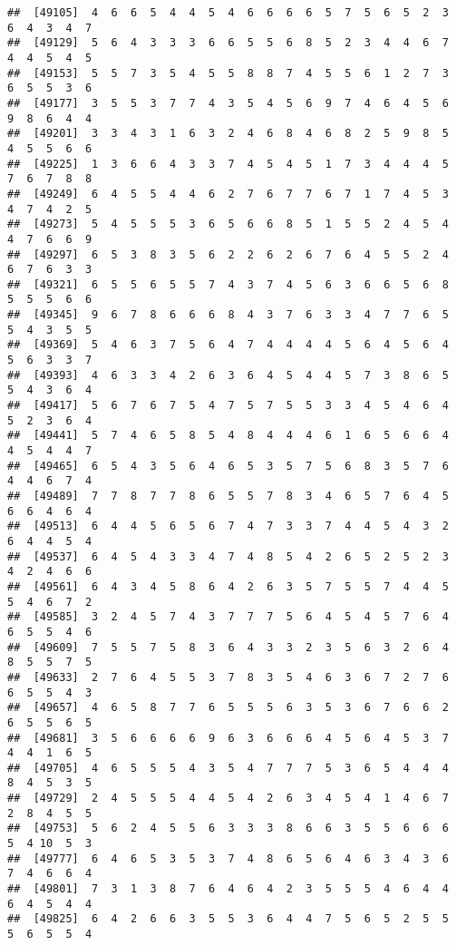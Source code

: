 \documentclass[
]{book}
\begin{document}
\begin{verbatim}
##  [49105]  4  6  6  5  4  4  5  4  6  6  6  6  5  7  5  6  5  2  3  6  4  3  4  7
##  [49129]  5  6  4  3  3  3  6  6  5  5  6  8  5  2  3  4  4  6  7  4  4  5  4  5
##  [49153]  5  5  7  3  5  4  5  5  8  8  7  4  5  5  6  1  2  7  3  6  5  5  3  6
##  [49177]  3  5  5  3  7  7  4  3  5  4  5  6  9  7  4  6  4  5  6  9  8  6  4  4
##  [49201]  3  3  4  3  1  6  3  2  4  6  8  4  6  8  2  5  9  8  5  4  5  5  6  6
##  [49225]  1  3  6  6  4  3  3  7  4  5  4  5  1  7  3  4  4  4  5  7  6  7  8  8
##  [49249]  6  4  5  5  4  4  6  2  7  6  7  7  6  7  1  7  4  5  3  4  7  4  2  5
##  [49273]  5  4  5  5  5  3  6  5  6  6  8  5  1  5  5  2  4  5  4  4  7  6  6  9
##  [49297]  6  5  3  8  3  5  6  2  2  6  2  6  7  6  4  5  5  2  4  6  7  6  3  3
##  [49321]  6  5  5  6  5  5  7  4  3  7  4  5  6  3  6  6  5  6  8  5  5  5  6  6
##  [49345]  9  6  7  8  6  6  6  8  4  3  7  6  3  3  4  7  7  6  5  5  4  3  5  5
##  [49369]  5  4  6  3  7  5  6  4  7  4  4  4  4  5  6  4  5  6  4  5  6  3  3  7
##  [49393]  4  6  3  3  4  2  6  3  6  4  5  4  4  5  7  3  8  6  5  5  4  3  6  4
##  [49417]  5  6  7  6  7  5  4  7  5  7  5  5  3  3  4  5  4  6  4  5  2  3  6  4
##  [49441]  5  7  4  6  5  8  5  4  8  4  4  4  6  1  6  5  6  6  4  4  5  4  4  7
##  [49465]  6  5  4  3  5  6  4  6  5  3  5  7  5  6  8  3  5  7  6  4  4  6  7  4
##  [49489]  7  7  8  7  7  8  6  5  5  7  8  3  4  6  5  7  6  4  5  6  6  4  6  4
##  [49513]  6  4  4  5  6  5  6  7  4  7  3  3  7  4  4  5  4  3  2  6  4  4  5  4
##  [49537]  6  4  5  4  3  3  4  7  4  8  5  4  2  6  5  2  5  2  3  4  2  4  6  6
##  [49561]  6  4  3  4  5  8  6  4  2  6  3  5  7  5  5  7  4  4  5  5  4  6  7  2
##  [49585]  3  2  4  5  7  4  3  7  7  7  5  6  4  5  4  5  7  6  4  6  5  5  4  6
##  [49609]  7  5  5  7  5  8  3  6  4  3  3  2  3  5  6  3  2  6  4  8  5  5  7  5
##  [49633]  2  7  6  4  5  5  3  7  8  3  5  4  6  3  6  7  2  7  6  6  5  5  4  3
##  [49657]  4  6  5  8  7  7  6  5  5  5  6  3  5  3  6  7  6  6  2  6  5  5  6  5
##  [49681]  3  5  6  6  6  6  9  6  3  6  6  6  4  5  6  4  5  3  7  4  4  1  6  5
##  [49705]  4  6  5  5  5  4  3  5  4  7  7  7  5  3  6  5  4  4  4  8  4  5  3  5
##  [49729]  2  4  5  5  5  4  4  5  4  2  6  3  4  5  4  1  4  6  7  2  8  4  5  5
##  [49753]  5  6  2  4  5  5  6  3  3  3  8  6  6  3  5  5  6  6  6  5  4 10  5  3
##  [49777]  6  4  6  5  3  5  3  7  4  8  6  5  6  4  6  3  4  3  6  7  4  6  6  4
##  [49801]  7  3  1  3  8  7  6  4  6  4  2  3  5  5  5  4  6  4  4  6  4  5  4  4
##  [49825]  6  4  2  6  6  3  5  5  3  6  4  4  7  5  6  5  2  5  5  5  6  5  5  4

\end{verbatim}
\end{document}
